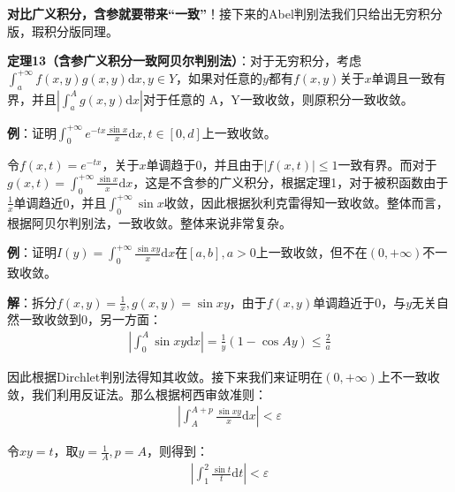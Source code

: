 \documentclass{ctexart}
\let\oldtextbf\textbf
\renewcommand{\textbf}[1]{\textcolor{brown!50!red}{\oldtextbf{#1}}}
\begin{document}
\textbf{\color{brown!50!red}对比广义积分，含参就要带来“一致”}！接下来的Abel判别法我们只给出无穷积分版，瑕积分版同理。
\begin{tcolorbox}[
    colback=bac2,     %
    colframe=fra2,   %
    coltitle=white,             %
    coltext=tex2,
    title=含参积分一致阿贝尔判别法,
    fonttitle=\bfseries,        %
arc=3mm,                     %
breakable
]

\textbf{\color{brown!50!red}定理13（含参广义积分一致阿贝尔判别法）}：对于无穷积分，考虑$\int_a^{+\infty}f(x,y)g(x,y)\mathrm{d}x,y\in Y$，如果对任意的$y$都有$f(x,y)$关于$x$单调且一致有界，并且$|\int_a^A g(x,y)\mathrm{d}x|$对于任意的
A，Y一致收敛，则原积分一致收敛。
\end{tcolorbox}


\textbf{\color{brown!50!red}例}：证明$\int_0^{+\infty}e^{-tx}\frac{\sin x}{x}\mathrm{d}x,t\in[0,d]$上一致收敛。

令$f(x,t)=e^{-tx}$，关于$x$单调趋于0，并且由于$|f(x,t)|\leq 1$一致有界。而对于$g(x,t)=\int_0^{+\infty}\frac{\sin x}{x}\mathrm{d}x$，这是不含参的广义积分，根据定理1，对于被积函数由于$\frac{1}{x}$单调趋近0，并且$\int_0^{+\infty}\sin x$收敛，因此根据狄利克雷得知一致收敛。整体而言，根据阿贝尔判别法，一致收敛。整体来说非常复杂。

\textbf{\color{brown!50!red}例}：证明$I(y)=\int_0^{+\infty}\frac{\sin xy}{x}\mathrm{d}x$在$[a,b],a>0$上一致收敛，但不在$(0,+\infty)$不一致收敛。

\textbf{\color{brown!50!red}解}：拆分$f(x,y)=\frac{1}{x},g(x,y)=\sin xy$，由于$f(x,y)$单调趋近于0，与$y$无关自然一致收敛到0，另一方面：
\begin{align*}
|\int_0^A \sin xy\mathrm{d}x |=\frac{1}{y}(1-\cos Ay)\leq\frac{2}{a}  
\end{align*}

因此根据Dirchlet判别法得知其收敛。接下来我们来证明在$(0,+\infty)$上不一致收敛，我们利用反证法。那么根据柯西审敛准则：
\begin{align*}
    |\int_A^{A+p}\frac{\sin xy}{x}\mathrm{d}x|<\varepsilon
\end{align*}

令$xy=t$，取$y=\frac{1}{A},p=A$，则得到：
\begin{align*}
    |\int_1^2\frac{\sin t}{t}\mathrm{d}t|<\varepsilon
\end{align*}
\end{document}
